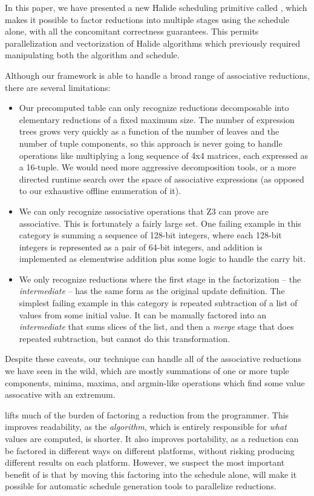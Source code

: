 In this paper, we have presented a new Halide scheduling primitive called , which makes it possible to factor reductions into multiple stages using the schedule alone, with all the concomitant correctness guarantees. This permits parallelization and vectorization of Halide algorithms which previously required manipulating both the algorithm and schedule.

Although our framework is able to handle a broad range of associative reductions, there are several limitations:

\begin{itemize}
\item Our precomputed table can only recognize reductions decomposable into elementary reductions of a fixed maximum size. The number of expression trees grows very quickly as a function of the number of leaves and the number of tuple components, so this approach is never going to handle operations like multiplying a long sequence of 4x4 matrices, each expressed as a 16-tuple. We would need more aggressive decomposition tools, or a more directed runtime search over the space of associative expressions (as opposed to our exhaustive offline enumeration of it).
\item We can only recognize associative operations that Z3 can prove are associative. This is fortunately a fairly large set. One failing example in this category is summing a sequence of 128-bit integers, where each 128-bit integers is represented as a pair of 64-bit integers, and addition is implemented as elementwise addition plus some logic to handle the carry bit.
\item We only recognize reductions where the first stage in the factorization -- the \emph{intermediate} -- has the same form as the original update definition. The simplest failing example in this category is repeated subtraction of a list of values from some initial value. It can be manually factored into an \emph{intermediate} that sums slices of the list, and then a \emph{merge} stage that does repeated subtraction, but  cannot do this transformation.
\end{itemize}

Despite these caveats, our technique can handle all of the associative reductions we have seen in the wild, which are mostly summations of one or more tuple components, minima, maxima, and argmin-like operations which find some value assocative with an extremum.

 lifts much of the burden of factoring a reduction from the programmer. This improves readability, as the \emph{algorithm}, which is entirely responsible for \emph{what} values are computed, is shorter. It also improves portability, as a reduction can be factored in different ways on different platforms, without risking producing different results on each platform. However, we suspect the most important benefit of  is that by moving this factoring into the schedule alone,  will make it possible for automatic schedule generation tools to parallelize reductions. 



